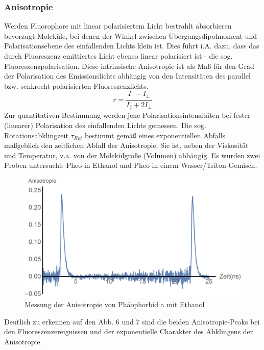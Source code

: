 \documentclass{article}
\begin{document}
\subsubsection{Anisotropie}
Werden Fluorophore mit linear polarisiertem Licht bestrahlt absorbieren bevorzugt Moleküle, bei denen der Winkel zwischen Übergangsdipolmoment und Polarisationsebene des einfallenden Lichts klein ist. Dies führt i.A. dazu, dass das durch Fluoreszenz emittiertes Licht ebenso linear polarisiert ist - die sog. Fluoreszenzpolarisation. Diese intrinsische Anisotropie ist als Maß für den Grad der Polarisation des Emissionslichts abhängig von den Intensitäten des parallel bzw. senkrecht polarisierten Fluoreszenzlichts. $$ r = \frac{I_\parallel-I_\perp}{I_\parallel+2 I_\perp} $$ Zur quantitativen Bestimmung werden jene Polarisationsintensitäten bei fester (linearer) Polarisation des einfallenden Lichts gemessen. Die sog. Rotationsabklingzeit $\tau_{Rot}$ bestimmt gemäß eines exponentiellen Abfalls maßgeblich den zeitlichen Abfall der Anisotropie. Sie ist, neben der Viskosität und Temperatur, v.a. von der Molekülgröße (Volumen) abhängig. Es wurden zwei Proben untersucht: Pheo in Ethanol und Pheo in einem Wasser/Triton-Gemisch.

\begin{figure}[H]
  \centering
  \includegraphics[width=\textwidth]{Bilder/anisotropie_ethanol.jpg}
  \caption{Messung der Anisotropie von Phäophorbid a mit Ethanol}
\end{figure}

Deutlich zu erkennen auf den Abb. 6 und 7 sind die beiden Anisotropie-Peaks bei den Fluoreszenzereignissen und der exponentielle Charakter des Abklingens der Anisotropie.
\end{document}
